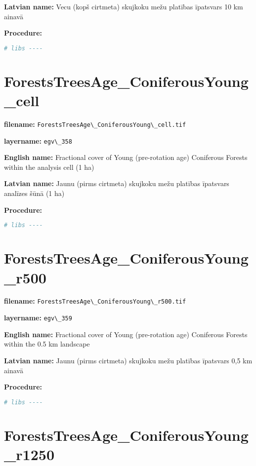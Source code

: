 \documentclass[
]{book}
\newcommand{\passthrough}[1]{#1}
\begin{document}
\textbf{Latvian name:} Vecu (kopš cirtmeta) skujkoku mežu platības īpatsvars 10 km ainavā

\textbf{Procedure:}

\begin{lstlisting}[language=R]
# libs ----
\end{lstlisting}

\section{ForestsTreesAge\_ConiferousYoung\_cell}\label{ch06.358}

\textbf{filename:} \passthrough{\lstinline!ForestsTreesAge\_ConiferousYoung\_cell.tif!}

\textbf{layername:} \passthrough{\lstinline!egv\_358!}

\textbf{English name:} Fractional cover of Young (pre-rotation age) Coniferous Forests within the analysis cell (1 ha)

\textbf{Latvian name:} Jaunu (pirms cirtmeta) skujkoku mežu platības īpatsvars analīzes šūnā (1 ha)

\textbf{Procedure:}

\begin{lstlisting}[language=R]
# libs ----
\end{lstlisting}

\section{ForestsTreesAge\_ConiferousYoung\_r500}\label{ch06.359}

\textbf{filename:} \passthrough{\lstinline!ForestsTreesAge\_ConiferousYoung\_r500.tif!}

\textbf{layername:} \passthrough{\lstinline!egv\_359!}

\textbf{English name:} Fractional cover of Young (pre-rotation age) Coniferous Forests within the 0.5 km landscape

\textbf{Latvian name:} Jaunu (pirms cirtmeta) skujkoku mežu platības īpatsvars 0,5 km ainavā

\textbf{Procedure:}

\begin{lstlisting}[language=R]
# libs ----
\end{lstlisting}

\section{ForestsTreesAge\_ConiferousYoung\_r1250}\label{ch06.360}
\end{document}
